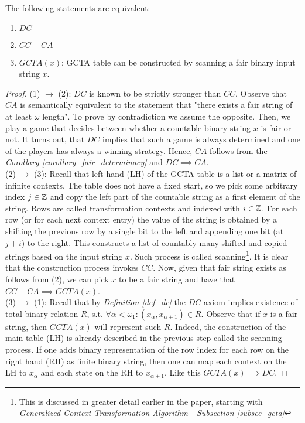 \begin{theorem}\label{theorem_dc_ca_gcta_equivalence}
  The following statements are equivalent:
  \begin{enumerate}
    \item $DC$
    \item $CC + CA$
    \item $GCTA(x)$: GCTA table can be constructed by scanning a fair binary input string $x$.
  \end{enumerate}
\end{theorem}
\begin{proof}
  (1) $\to$ (2): $DC$ is known \cite{herrlich2006ac} to be strictly stronger than $CC$. Observe that $CA$ is semantically equivalent to the statement that "there exists a fair string of at least $\omega$ length". To prove by contradiction we assume the opposite. Then, we play a game that decides between whether a countable binary string $x$ is fair or not. It turns out, that $DC$ implies that such a game is always determined and one of the players has always a winning strategy. Hence, $CA$ follows from the \textit{Corollary \ref{corollary_fair_determinacy}} and $DC \implies CA$.
  \\
  (2) $\to$ (3): Recall that left hand (LH) of the GCTA table is a list or a matrix of infinite contexts. The table does not have a fixed start, so we pick some arbitrary index $j \in \mathbb{Z}$ and copy the left part of the countable string as a first element of the string. Rows are called transformation contexts and indexed with $i \in \mathbb{Z}$. For each row (or for each next context entry) the value of the string is obtained by a shifting the previous row by a single bit to the left and appending one bit (at $j+i$) to the right. This constructs a list of countably many shifted and copied strings based on the input string $x$. Such process is called scanning\footnote{This is discussed in greater detail earlier in the paper, starting with \textit{Generalized Context Transformation Algorithm - Subsection \ref{subsec_gcta}}}. It is clear that the construction process invokes $CC$. Now, given that fair string exists as follows from (2), we can pick $x$ to be a fair string and have that $CC + CA \implies GCTA(x)$.
  \\
  (3) $\to$ (1): Recall that by \textit{Definition \ref{def_dc}} the $DC$ axiom implies existence of total binary relation $R$, s.t. $\forall \alpha < \omega_1: (x_\alpha, x_{\alpha+1}) \in R$. Observe that if $x$ is a fair string, then $GCTA(x)$ will represent such $R$. Indeed, the construction of the main table (LH) is already described in the previous step called the scanning process. If one adds binary representation of the row index for each row on the right hand (RH) as finite binary string, then one can map each context on the LH to $x_{\alpha}$ and each state on the RH to $x_{\alpha+1}$. Like this $GCTA(x) \implies DC$.
\end{proof}

